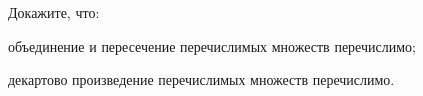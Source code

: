 Докажите, что:
\begin{enumcyr}
    \item объединение и пересечение перечислимых множеств перечислимо;
    \item декартово произведение перечислимых множеств перечислимо.
\end{enumcyr}